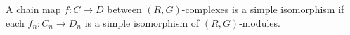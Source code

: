 A chain map $f: C \to D$ between $(R, G)$-complexes is a simple isomorphism if each $f_n: C_n \to D_n$ is a simple isomorphism of $(R, G)$-modules.
